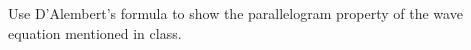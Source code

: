 \item Use D'Alembert's formula to show the parallelogram property of the wave equation mentioned in class.
\bigbreak
